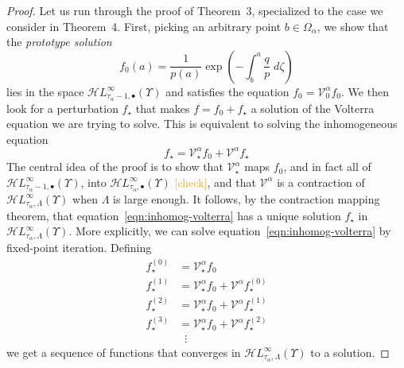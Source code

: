 \documentclass{article}
\newcommand{\singexp}[2]{\mathcal{H}L^\infty_{#1, #2}}
\newcommand{\singexpalg}[1]{\singexp{#1}{\bullet}}
\newcommand{\volterra}{\mathcal{V}}
\newcommand{\hardpart}{\mathcal{V}_0}
\newcommand{\softpart}{\mathcal{V}_\star}
\newcommand{\solwhole}{f}
\newcommand{\solproto}{f_0}
\newcommand{\solptb}{f_\star}
\theoremstyle{definition}
\theoremstyle{plain}
\begin{document}
\begin{proof}
Let us run through the proof of Theorem~3, specialized to the case we consider in Theorem~4. First, picking an arbitrary point $b \in \Omega_\alpha$, we show that the {\em prototype solution}
\[ \solproto(a) = \frac{1}{p(a)} \exp\left(-\int_{b}^{a}\frac{q}{p}\;d\zeta\right) \]
lies in the space $\singexpalg{\tau_\alpha - 1}(\Upsilon)$ and satisfies the equation $\solproto = \hardpart^\alpha \solproto$. We then look for a perturbation $\solptb$ that makes $\solwhole = \solproto + \solptb$ a solution of the Volterra equation we are trying to solve. This is equivalent to solving the inhomogeneous equation
\begin{equation}\label{eqn:inhomog-volterra}
\solptb = \softpart^\alpha \solproto + \volterra^\alpha \solptb
\end{equation}
The central idea of the proof is to show that $\softpart^\alpha$ maps $\solproto$, and in fact all of $\singexpalg{\tau_\alpha - 1}(\Upsilon)$, into $\singexpalg{\tau_\alpha}(\Upsilon)$ \textcolor{orange}{[check]}, and that $\volterra^\alpha$ is a contraction of $\singexp{\tau_\alpha}{\Lambda}(\Upsilon)$ when $\Lambda$ is large enough. It follows, by the contraction mapping theorem, that equation~\eqref{eqn:inhomog-volterra} has a unique solution $\solptb$ in $\singexp{\tau_\alpha}{\Lambda}(\Upsilon)$. More explicitly, we can solve equation~\eqref{eqn:inhomog-volterra} by fixed-point iteration. Defining
\begin{align*}
\solptb^{(0)} & = \softpart^\alpha \solproto \\
\solptb^{(1)} & = \softpart^\alpha \solproto + \volterra^\alpha \solptb^{(0)} \\
\solptb^{(2)} & = \softpart^\alpha \solproto + \volterra^\alpha \solptb^{(1)} \\
\solptb^{(3)} & = \softpart^\alpha \solproto + \volterra^\alpha \solptb^{(2)} \\
& \;\;\vdots
\end{align*}
we get a sequence of functions that converges in $\singexp{\tau_\alpha}{\Lambda}(\Upsilon)$ to a solution.


\end{proof}
\end{document}
